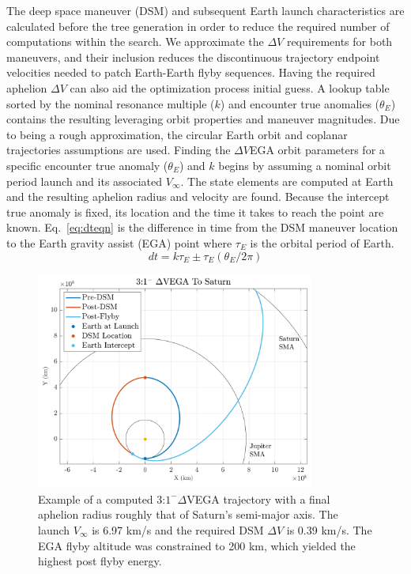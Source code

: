 \documentclass[letterpaper, paper,11pt]{./AAS}		%
\begin{document}
The deep space maneuver (DSM) and subsequent Earth launch characteristics are calculated before the tree generation in order to reduce the required number of computations within the search. We approximate the $\Delta V$ requirements for both maneuvers, and their inclusion reduces the discontinuous trajectory endpoint velocities needed to patch Earth-Earth flyby sequences. Having the required aphelion $\Delta V$ can also aid the optimization process initial guess. A lookup table sorted by the nominal resonance multiple ($k$) and encounter true anomalies ($\theta_{E}$) contains the resulting leveraging orbit properties and maneuver magnitudes. Due to being a rough approximation, the circular Earth orbit and coplanar trajectories assumptions are used. Finding the $\Delta V$EGA orbit parameters for a specific encounter true anomaly ($\theta_{E}$) and $k$ begins by assuming a nominal orbit period launch and its associated $V_\infty$. The state elements are computed at Earth and the resulting aphelion radius and velocity are found. Because the intercept true anomaly is fixed, its location and the time it takes to reach the point are known. Eq.~\eqref{eq:dteqn} is the difference in time from the DSM maneuver location to the Earth gravity assist (EGA) point where $\tau_E$ is the orbital period of Earth.
%
\begin{equation}
	\label{eq:dteqn}
	dt = k\tau_E \pm \tau_E(\theta_E/2\pi)
\end{equation}
%
%
\begin{figure}[htb]
	\centering\includegraphics[width=3.6in]{./Figures/dsmmatlab}
	\caption{Example of a computed 3:$1^{-} \Delta$VEGA trajectory with a final aphelion radius roughly that of Saturn's semi-major axis. The launch $V_\infty$ is 6.97 km/s and the required DSM $\Delta V$ is 0.39 km/s. The EGA flyby altitude was constrained to 200 km, which yielded the highest post flyby energy.}
	\label{fig:dsmmatlab}
\end{figure}
\end{document}
